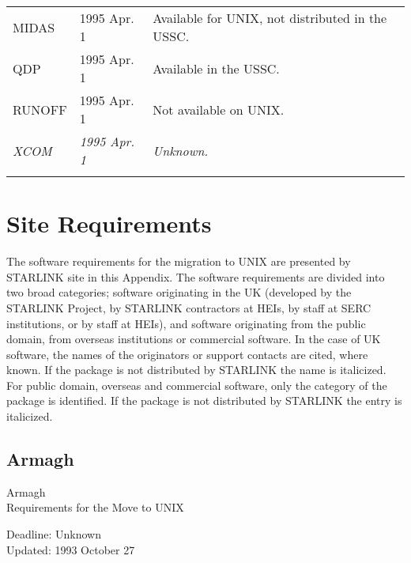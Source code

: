 \begin{table}
\begin{center}
\begin{tabular}{|p{36mm}|p{30mm}|p{60mm}|}
MIDAS                 & 1995 Apr. 1 & Available for UNIX, not distributed in
   the USSC. \\
QDP                   & 1995 Apr. 1 & Available in the USSC. \\
RUNOFF                & 1995 Apr. 1 & Not available on UNIX. \\
{\em XCOM}            & {\em 1995 Apr. 1} & {\em Unknown.} \\
& & \\ \hline
\end{tabular}
\end{center}
\end{table}

\appendix
\newpage
\section{Site Requirements}

The software requirements for the migration to UNIX are presented by STARLINK
site in this Appendix.
The software requirements are divided into two broad categories; software
originating in the UK (developed by the STARLINK Project, by STARLINK
contractors at HEIs, by staff at SERC institutions, or by staff at HEIs), and
software originating from the public domain, from overseas institutions or
commercial software.
In the case of UK software, the names of the originators or support contacts
are cited, where known.
If the package is not distributed by STARLINK the name is italicized.
For public domain, overseas and commercial software, only the category of the
package is identified.
If the package is not distributed by STARLINK the entry is italicized.


\newpage
\subsection{Armagh}

\renewcommand{\starsitename}{Armagh}
\renewcommand{\starnodename}{ARVAD}

\renewcommand{\starunixdate}{Unknown}
\renewcommand{\starupdate}{1993 October 27}

\renewcommand{\starsitetelephone}{0861 522928}
\renewcommand{\starsitefax}{0861 527174}

\begin{center}
{\Large\sc \starsitename \\ [2ex]
           Requirements for the Move to UNIX}

\vspace{3mm}
{\large\sc Deadline: \starunixdate \\ [1ex]
           Updated: \starupdate}
\end{center}

